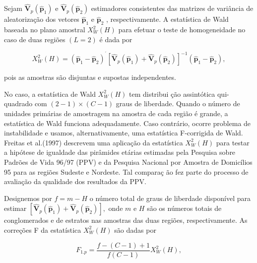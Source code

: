 \documentclass[]{book}
\numberwithin{example}{chapter}
\numberwithin{remark}{chapter}
\numberwithin{definition}{chapter}
\begin{document}
Sejam \(\mathbf{\hat{V}}_{p}\left( \widehat{\mathbf{p}}_{1}\right)\) e
\(\mathbf{\hat{V}}_{p}\left( \widehat{\mathbf{p}}_{2}\right)\)
estimadores consistentes das matrizes de variância de aleatorização dos
vetores \(\widehat{\mathbf{p}}_{1}\) e \(\widehat{\mathbf{p}}_{2}\) ,
respectivamente. A estatística de Wald baseada no plano amostral
\(X_{W}^{2}\left( H\right)\) para efetuar o teste de homogeneidade no
caso de duas regiões \(\left( L=2\right)\) é dada por

\begin{equation}
X_{W}^{2}\left( H\right) =\left( \mathbf{\hat{p}}_{1}-\mathbf{\hat{p}}
_{2}\right) ^{^{\prime }}\left[ \mathbf{\hat{V}}_{p}\left( \widehat{\mathbf{p
}}_{1}\right) +\mathbf{\hat{V}}_{p}\left( \widehat{\mathbf{p}}_{2}\right)
\right] ^{-1}\left( \mathbf{\hat{p}}_{1}-\mathbf{\hat{p}}_{2}\right) ,
\label{eq:Tab1}
\end{equation}

pois as amostras são disjuntas e supostas independentes.

No caso, a estatística de Wald \(X_{W}^{2}\left( H\right)\) tem
distribui ção assintótica qui-quadrado com
\(\left( 2-1\right) \times \left( C-1\right)\) graus de liberdade.
Quando o número de unidades primárias de amostragem na amostra de cada
região é grande, a estatística de Wald funciona adequadamente. Caso
contrário, ocorre problema de instabilidade e usamos, alternativamente,
uma estatística F-corrigida de Wald. Freitas et al.(1997) descrevem uma
aplicação da estatística \(X_{W}^{2}\left( H\right)\) para testar a
hipótese de igualdade das pirâmides etárias estimadas pela Pesquisa
sobre Padrões de Vida 96/97 (PPV) e da Pesquisa Nacional por Amostra de
Domicílios 95 para as regiões Sudeste e Nordeste. Tal compara\c{c
}ão fez parte do processo de avaliação da qualidade dos resultados da
PPV.

Designemos por \(f=m-H\) o número total de graus de liberdade disponível
para estimar
\(\left[ \mathbf{\hat{V}}_{p}\left( \widehat{ \mathbf{p}}_{1}\right) +\mathbf{\hat{V}}_{p}\left( \widehat{\mathbf{p}} _{2}\right) \right] ,\)
onde \(m\) e \(H\) são os números totais de conglomerados e de estratos
nas amostras das duas regiões, respectivamente. As correções F da
estatística \(X_{W}^{2}\left( H\right)\) são dadas por

\begin{equation}
F_{1.p}=\frac{f-\left( C-1\right) +1}{f\left( C-1\right) }X_{W}^{2}\left(
H\right) , \label{eq:Tab2} 
\end{equation}
\end{document}
